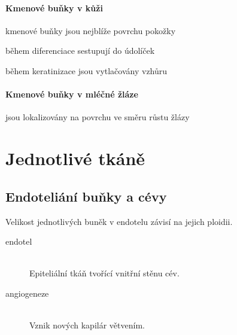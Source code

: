 \documentclass[DIV=8]{scrreprt}
\begin{document}
\paragraph{Kmenové buňky v kůži}
\begin{myItemize}[nosep]
    \item kmenové buňky jsou nejblíže povrchu pokožky
    \item během diferenciace sestupují do údolíček
    \item během keratinizace jsou vytlačovány vzhůru
\end{myItemize}



\paragraph{Kmenové buňky v mléčné žláze}
\begin{myItemize}[nosep]
    \item jsou lokalizovány na povrchu ve směru růstu žlázy
\end{myItemize}



\section{Jednotlivé tkáně} \label{Jednotlivé tkáně} \FloatBarrier


\subsection{Endoteliání buňky a cévy} \label{Endoteliání buňky a cévy}


Velikost jednotlivých buněk v endotelu závisí na jejich ploidii.

\begin{description}
\item[endotel]\hfill \\
Epiteliální tkáň tvořící vnitřní stěnu cév.


\item[angiogeneze]\hfill \\
Vznik nových kapilár větvením.

\end{description}
\end{document}
